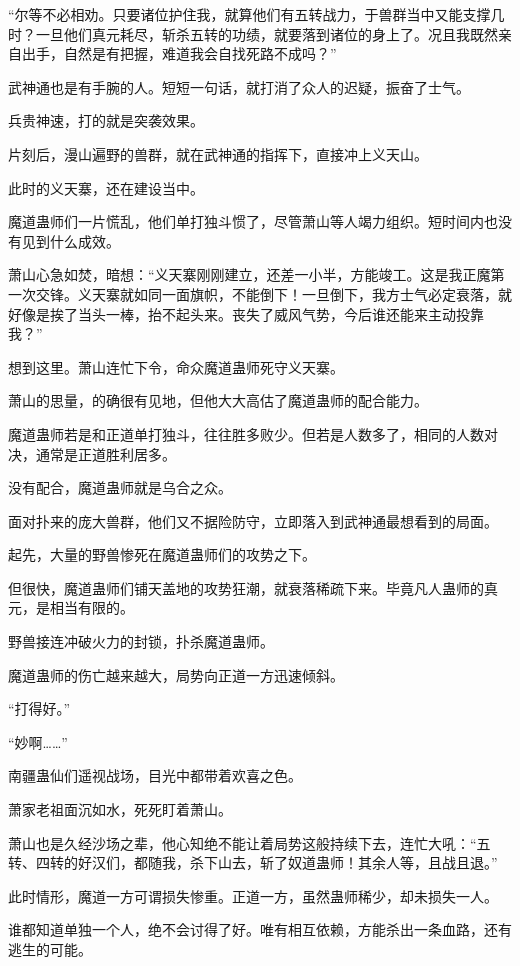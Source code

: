 \begin{this_body}
“尔等不必相劝。只要诸位护住我，就算他们有五转战力，于兽群当中又能支撑几时？一旦他们真元耗尽，斩杀五转的功绩，就要落到诸位的身上了。况且我既然亲自出手，自然是有把握，难道我会自找死路不成吗？”

武神通也是有手腕的人。短短一句话，就打消了众人的迟疑，振奋了士气。

兵贵神速，打的就是突袭效果。

片刻后，漫山遍野的兽群，就在武神通的指挥下，直接冲上义天山。

此时的义天寨，还在建设当中。

魔道蛊师们一片慌乱，他们单打独斗惯了，尽管萧山等人竭力组织。短时间内也没有见到什么成效。

萧山心急如焚，暗想：“义天寨刚刚建立，还差一小半，方能竣工。这是我正魔第一次交锋。义天寨就如同一面旗帜，不能倒下！一旦倒下，我方士气必定衰落，就好像是挨了当头一棒，抬不起头来。丧失了威风气势，今后谁还能来主动投靠我？”

想到这里。萧山连忙下令，命众魔道蛊师死守义天寨。

萧山的思量，的确很有见地，但他大大高估了魔道蛊师的配合能力。

魔道蛊师若是和正道单打独斗，往往胜多败少。但若是人数多了，相同的人数对决，通常是正道胜利居多。

没有配合，魔道蛊师就是乌合之众。

面对扑来的庞大兽群，他们又不据险防守，立即落入到武神通最想看到的局面。

起先，大量的野兽惨死在魔道蛊师们的攻势之下。

但很快，魔道蛊师们铺天盖地的攻势狂潮，就衰落稀疏下来。毕竟凡人蛊师的真元，是相当有限的。

野兽接连冲破火力的封锁，扑杀魔道蛊师。

魔道蛊师的伤亡越来越大，局势向正道一方迅速倾斜。

“打得好。”

“妙啊……”

南疆蛊仙们遥视战场，目光中都带着欢喜之色。

萧家老祖面沉如水，死死盯着萧山。

萧山也是久经沙场之辈，他心知绝不能让着局势这般持续下去，连忙大吼：“五转、四转的好汉们，都随我，杀下山去，斩了奴道蛊师！其余人等，且战且退。”

此时情形，魔道一方可谓损失惨重。正道一方，虽然蛊师稀少，却未损失一人。

谁都知道单独一个人，绝不会讨得了好。唯有相互依赖，方能杀出一条血路，还有逃生的可能。


\end{this_body}
